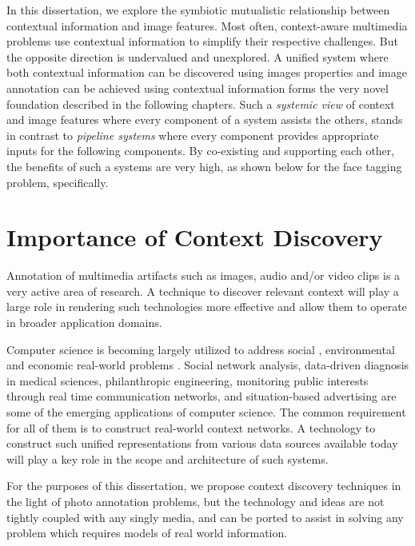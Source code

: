In this dissertation, we explore the symbiotic mutualistic relationship between contextual information and image features. Most often, context-aware multimedia problems use contextual information to simplify their respective challenges. But the opposite direction is undervalued and unexplored. A unified system where both contextual information can be discovered using images properties and image annotation can be achieved using contextual information forms the very novel foundation described in the following chapters. Such a \textit{systemic view} \cite{capra1997web} of context and image features where every component of a system assists the others, stands in contrast to \textit{pipeline systems} where every component provides appropriate inputs for the following components. By co-existing and supporting each other, the benefits of such a systems are very high, as shown below for the face tagging problem, specifically. 

\section{Importance of Context Discovery}

Annotation of multimedia artifacts such as images, audio and/or video clips \cite{galleguillos2010context, pang2011efficient, poppe2010survey, vinciarelli2009social, yang2010recognizing, zhao2003face, zeng2009survey} is a very active area of research. A technique to discover relevant context will play a large role in rendering such technologies more effective and allow them to operate in broader application domains.

Computer science is becoming largely utilized to address social \cite{sambasivan2010intermediated}, environmental \cite{ahrens2011data} and economic real-world problems \cite{chlistalla2011high}. Social network analysis, data-driven diagnosis in medical sciences, philanthropic engineering, monitoring public interests through real time communication networks, and situation-based advertising are some of the emerging applications of computer science. The common requirement for all of them is to construct real-world context networks. A technology to construct such unified representations from various data sources available today will play a key role in the scope and architecture of such systems.

For the purposes of this dissertation, we propose context discovery techniques in the light of photo annotation problems, but the technology and ideas are not tightly coupled with any singly media, and can be ported to assist in solving any problem which requires models of real world information.

